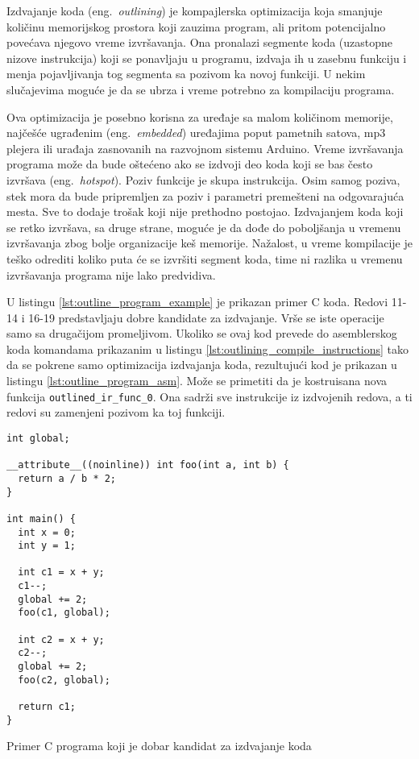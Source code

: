 \documentclass[12pt,oneside]{memoir}
\begin{document}

Izdvajanje koda (eng.~{\em outlining}) je kompajlerska optimizacija koja smanjuje količinu memorijskog prostora koji zauzima program, ali pritom potencijalno povećava njegovo vreme izvršavanja.
Ona pronalazi segmente koda (uzastopne nizove instrukcija) koji se ponavljaju u programu, izdvaja ih u zasebnu funkciju i menja pojavljivanja tog segmenta sa pozivom ka novoj funkciji.
U nekim slučajevima moguće je da se ubrza i vreme potrebno za kompilaciju programa.

Ova optimizacija je posebno korisna za uređaje sa malom količinom memorije, najčešće ugrađenim (eng.~{\em embedded}) uređajima poput pametnih satova, mp3 plejera ili urađaja zasnovanih na razvojnom sistemu Arduino.
Vreme izvršavanja programa može da bude oštećeno ako se izdvoji deo koda koji se bas često izvršava (eng.~{\em hotspot}).
Poziv funkcije je skupa instrukcija.
Osim samog poziva, stek mora da bude pripremljen za poziv i parametri premešteni na odgovarajuća mesta.
Sve to dodaje trošak koji nije prethodno postojao.
Izdvajanjem koda koji se retko izvršava, sa druge strane, moguće je da dođe do poboljšanja u vremenu izvršavanja zbog bolje organizacije keš memorije.
Nažalost, u vreme kompilacije je teško odrediti koliko puta će se izvršiti segment koda, time ni razlika u vremenu izvršavanja programa nije lako predvidiva.

U listingu \ref{lst:outline_program_example} je prikazan primer C koda.
Redovi 11-14 i 16-19 predstavljaju dobre kandidate za izdvajanje. Vrše se iste operacije samo sa drugačijom promeljivom.
Ukoliko se ovaj kod prevede do asemblerskog koda komandama prikazanim u listingu \ref{lst:outlining_compile_instructions} tako da se pokrene samo optimizacija izdvajanja koda, rezultujući kod je prikazan u listingu \ref{lst:outline_program_asm}.
Može se primetiti da je kostruisana nova funkcija \verb|outlined_ir_func_0|. Ona sadrži sve instrukcije iz izdvojenih redova, a ti redovi su zamenjeni pozivom ka toj funkciji.

\begin{listing}
\begin{verbatim}
int global;

__attribute__((noinline)) int foo(int a, int b) {
  return a / b * 2;
}

int main() {
  int x = 0;
  int y = 1;
  
  int c1 = x + y;
  c1--;
  global += 2;
  foo(c1, global);
  
  int c2 = x + y;
  c2--;
  global += 2;
  foo(c2, global);
  
  return c1;
}
\end{verbatim}
\caption{Primer C programa koji je dobar kandidat za izdvajanje koda}
\label{lst:outline_program_example}
\end{listing}
\end{document}

